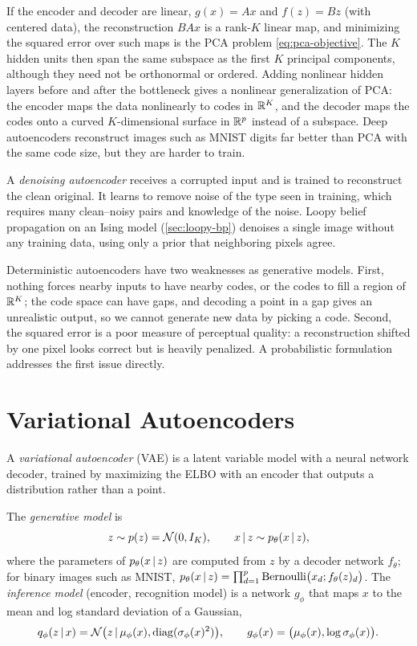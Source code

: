 \begin{remark}\label{rem:linear-ae-pca}
If the encoder and decoder are linear, $g(x)=Ax$ and $f(z)=Bz$ (with centered data), the reconstruction $BAx$ is a rank-$K$ linear map, and minimizing the squared error over such maps is the PCA problem \eqref{eq:pca-objective}. The $K$ hidden units then span the same subspace as the first $K$ principal components, although they need not be orthonormal or ordered. Adding nonlinear hidden layers before and after the bottleneck gives a nonlinear generalization of PCA: the encoder maps the data nonlinearly to codes in $\mathbb{R}^K$, and the decoder maps the codes onto a curved $K$-dimensional surface in $\mathbb{R}^p$ instead of a subspace. Deep autoencoders reconstruct images such as MNIST digits far better than PCA with the same code size, but they are harder to train.
\end{remark}

A \emph{denoising autoencoder} receives a corrupted input and is trained to reconstruct the clean original. It learns to remove noise of the type seen in training, which requires many clean--noisy pairs and knowledge of the noise. Loopy belief propagation on an Ising model (\cref{sec:loopy-bp}) denoises a single image without any training data, using only a prior that neighboring pixels agree.

Deterministic autoencoders have two weaknesses as generative models. First, nothing forces nearby inputs to have nearby codes, or the codes to fill a region of $\mathbb{R}^K$; the code space can have gaps, and decoding a point in a gap gives an unrealistic output, so we cannot generate new data by picking a code. Second, the squared error is a poor measure of perceptual quality: a reconstruction shifted by one pixel looks correct but is heavily penalized. A probabilistic formulation addresses the first issue directly.

\section{Variational Autoencoders}\label{sec:vae}

A \emph{variational autoencoder} (VAE) is a latent variable model with a neural network decoder, trained by maximizing the ELBO with an encoder that outputs a distribution rather than a point.

\begin{definition}\label{def:vae}
The \emph{generative model} is
\[
z\sim p(z)=\mathcal{N}(0,I_K),\qquad x\,|\, z\sim p_\theta(x\,|\, z),
\]
where the parameters of $p_\theta(x\,|\, z)$ are computed from $z$ by a decoder network $f_\theta$; for binary images such as MNIST, $p_\theta(x\,|\, z)=\prod_{d=1}^p\mathrm{Bernoulli}\big(x_d;f_\theta(z)_d\big)$. The \emph{inference model} (encoder, recognition model) is a network $g_\phi$ that maps $x$ to the mean and log standard deviation of a Gaussian,
\[
q_\phi(z\,|\, x)=\mathcal{N}\big(z\,|\,\mu_\phi(x),\operatorname{diag}(\sigma_\phi(x)^2)\big),\qquad g_\phi(x)=\big(\mu_\phi(x),\log\sigma_\phi(x)\big).
\]
\end{definition}

